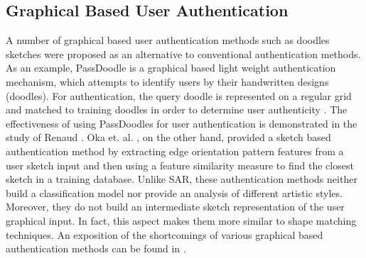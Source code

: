 
\vspace{-2mm}
\subsection{Graphical Based User Authentication }
\vspace{-2mm}
A number of graphical based user authentication methods such as doodles sketches were proposed as an alternative to conventional authentication methods. As an example, PassDoodle is a graphical based light weight authentication mechanism, which attempts to identify users by their handwritten designs (doodles). For authentication, the query doodle is represented on a regular grid and matched to training doodles in order to determine user authenticity \cite{varenhorst2004passdoodles,Govindarajulu:2007:PMU:1322192.1322233}. The effectiveness of using PassDoodles for user authentication is demonstrated in the study of Renaud . Oka et. al. , on the other hand, provided a sketch based authentication method by extracting edge orientation pattern features from a user sketch input and then using a feature similarity measure to find the closest sketch in a training database. Unlike SAR, these authentication methods neither build a classification model nor provide an analysis of different artistic styles. Moreover, they do not build an intermediate sketch representation of the user graphical input. In fact, this aspect makes them more similar to shape matching techniques. An exposition of the shortcomings of various graphical based authentication methods can be found in \cite{gani2010new}.


